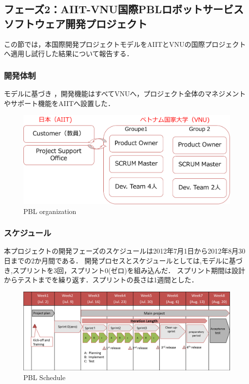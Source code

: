 \documentclass[a4j, 12Q, twocolumn, twoside]{jsarticle}
\begin{document}
\subsection{フェーズ2：AIIT-VNU国際PBLロボットサービスソフトウェア開発プロジェクト}

この節では，本国際開発プロジェクトモデルをAIITとVNUの国際プロジェクトへ適用し試行した結果について報告する．

\subsubsection{開発体制}
モデルに基づき ，開発機能はすべてVNUへ，プロジェクト全体のマネジメントやサポート機能をAIITへ設置した．
\begin{figure}[htb]
  \begin{center}
    \includegraphics[width=\columnwidth]{./figures/PBL_organization.png}
    \caption{PBL organization}
    \label{fig:pblorganization}
  \end{center}
\end{figure}



\subsubsection{スケジュール}
本プロジェクトの開発フェーズのスケジュールは2012年7月1日から2012年8月30日までの2か月間である．
開発プロセスとスケジュールとしては,モデルに基づき,スプリントを3回，スプリント0(ゼロ)を組み込んだ．
スプリント期間は設計からテストまでを繰り返す．スプリントの長さは1週間とした．
\begin{figure}[htb]
  \begin{center}
    \includegraphics[width=\columnwidth]{./figures/PBLSchedule.png}
    \caption{PBL Schedule}
    \label{fig:PBLSchedule}
  \end{center}
\end{figure}
\end{document}
